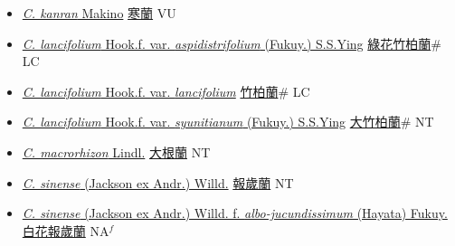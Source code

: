 \begin{itemize}
\begin{itemize}
        \item[] \href{http://www.theplantlist.org/tpl1.1/search?q=Cymbidium+kanran}{\textit{C. kanran} Makino}   \href{\detokenize{http://taibnet.sinica.edu.tw/chi/taibnet_species_list.php?T2=寒蘭&T2_new_value=true&fr=y}}{寒蘭} VU
        \item[] \href{http://www.theplantlist.org/tpl1.1/search?q=Cymbidium+lancifolium+var.+aspidistrifolium}{\textit{C. lancifolium} Hook.f. var. \textit{aspidistrifolium} (Fukuy.) S.S.Ying}   \href{\detokenize{http://taibnet.sinica.edu.tw/chi/taibnet_species_list.php?T2=綠花竹柏蘭&T2_new_value=true&fr=y}}{綠花竹柏蘭}\# LC
        \item[] \href{http://www.theplantlist.org/tpl1.1/search?q=Cymbidium+lancifolium+var.+lancifolium}{\textit{C. lancifolium} Hook.f. var. \textit{lancifolium}}   \href{\detokenize{http://taibnet.sinica.edu.tw/chi/taibnet_species_list.php?T2=竹柏蘭&T2_new_value=true&fr=y}}{竹柏蘭}\# LC
        \item[] \href{http://www.theplantlist.org/tpl1.1/search?q=Cymbidium+lancifolium+var.+syunitianum}{\textit{C. lancifolium} Hook.f. var. \textit{syunitianum} (Fukuy.) S.S.Ying}   \href{\detokenize{http://taibnet.sinica.edu.tw/chi/taibnet_species_list.php?T2=大竹柏蘭&T2_new_value=true&fr=y}}{大竹柏蘭}\# NT
        \item[] \href{http://www.theplantlist.org/tpl1.1/search?q=Cymbidium+macrorhizon}{\textit{C. macrorhizon} Lindl.}   \href{\detokenize{http://taibnet.sinica.edu.tw/chi/taibnet_species_list.php?T2=大根蘭&T2_new_value=true&fr=y}}{大根蘭} NT
        \item[] \href{http://www.theplantlist.org/tpl1.1/search?q=Cymbidium+sinense}{\textit{C. sinense} (Jackson ex Andr.) Willd.}   \href{\detokenize{http://taibnet.sinica.edu.tw/chi/taibnet_species_list.php?T2=報歲蘭&T2_new_value=true&fr=y}}{報歲蘭} NT
        \item[] \href{http://www.theplantlist.org/tpl1.1/search?q=Cymbidium+sinense+ f. +albo-jucundissimum}{\textit{C. sinense} (Jackson ex Andr.) Willd.  f.  \textit{albo-jucundissimum} (Hayata) Fukuy.}   \href{\detokenize{http://taibnet.sinica.edu.tw/chi/taibnet_species_list.php?T2=白花報歲蘭&T2_new_value=true&fr=y}}{白花報歲蘭} NA$^f$

\end{itemize}
\end{itemize}
